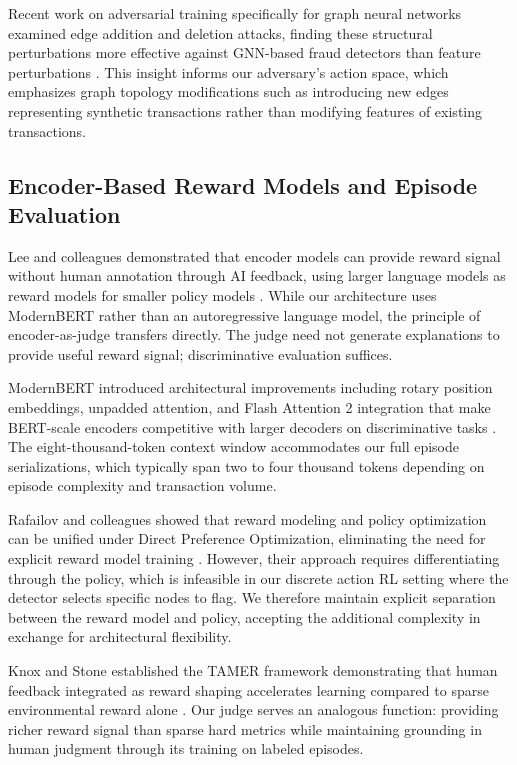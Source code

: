 \documentclass[11pt,a4paper]{article}
\begin{document}
Recent work on adversarial training specifically for graph neural networks examined edge addition and deletion attacks, finding these structural perturbations more effective against GNN-based fraud detectors than feature perturbations \citep{hsieh2023adversarial}. This insight informs our adversary's action space, which emphasizes graph topology modifications such as introducing new edges representing synthetic transactions rather than modifying features of existing transactions.

\subsection{Encoder-Based Reward Models and Episode Evaluation}

Lee and colleagues demonstrated that encoder models can provide reward signal without human annotation through AI feedback, using larger language models as reward models for smaller policy models \citep{lee2023rlaif}. While our architecture uses ModernBERT rather than an autoregressive language model, the principle of encoder-as-judge transfers directly. The judge need not generate explanations to provide useful reward signal; discriminative evaluation suffices.

ModernBERT introduced architectural improvements including rotary position embeddings, unpadded attention, and Flash Attention 2 integration that make BERT-scale encoders competitive with larger decoders on discriminative tasks \citep{warner2024modernbert}. The eight-thousand-token context window accommodates our full episode serializations, which typically span two to four thousand tokens depending on episode complexity and transaction volume.

Rafailov and colleagues showed that reward modeling and policy optimization can be unified under Direct Preference Optimization, eliminating the need for explicit reward model training \citep{rafailov2023direct}. However, their approach requires differentiating through the policy, which is infeasible in our discrete action RL setting where the detector selects specific nodes to flag. We therefore maintain explicit separation between the reward model and policy, accepting the additional complexity in exchange for architectural flexibility.

Knox and Stone established the TAMER framework demonstrating that human feedback integrated as reward shaping accelerates learning compared to sparse environmental reward alone \citep{knox2009interactively}. Our judge serves an analogous function: providing richer reward signal than sparse hard metrics while maintaining grounding in human judgment through its training on labeled episodes.
\end{document}
